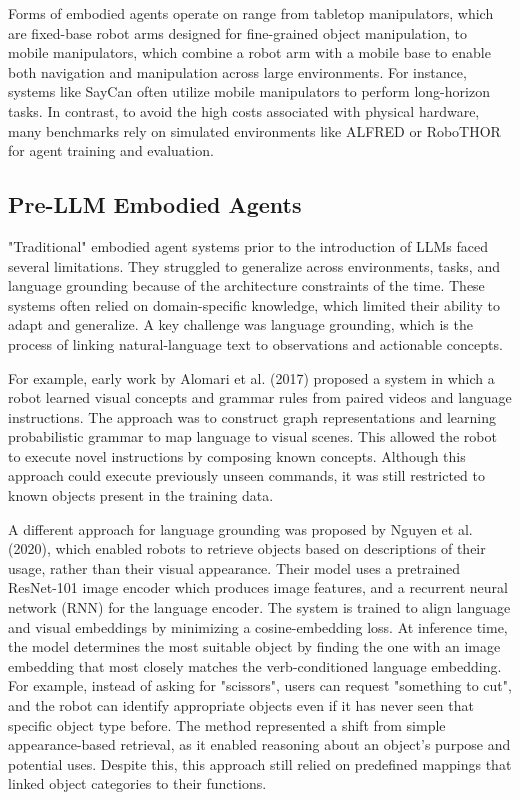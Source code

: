 \documentclass[11pt]{article}
\begin{document}
Forms of embodied agents operate on range from tabletop manipulators, which are fixed-base robot arms designed for fine-grained object manipulation, to mobile manipulators, which combine a robot arm with a mobile base to enable both navigation and manipulation across large environments. For instance, systems like SayCan often utilize mobile manipulators to perform long-horizon tasks. In contrast, to avoid the high costs associated with physical hardware, many benchmarks rely on simulated environments like ALFRED or RoboTHOR for agent training and evaluation. 


\subsection{Pre-LLM Embodied Agents}
"Traditional" embodied agent systems prior to the introduction of LLMs faced several limitations.
They struggled to generalize across environments, tasks, and language grounding because of the architecture constraints of the time. These systems often relied on domain-specific knowledge, which limited their ability to adapt and generalize.
A key challenge was language grounding, which is the process of linking natural-language text to observations and actionable concepts.

For example, early work by Alomari et al. (2017) proposed a system in which a robot learned visual concepts and grammar rules from paired videos and language instructions. The approach was to construct graph representations and learning probabilistic grammar to map language to visual scenes. This allowed the robot to execute novel instructions by composing known concepts. Although this approach could execute previously unseen commands, it was still restricted to known objects present in the training data. 

A different approach for language grounding was proposed by Nguyen et al. (2020), which enabled robots to retrieve objects based on descriptions of their usage, rather than their visual appearance. Their model uses a pretrained ResNet-101 image encoder which produces image features, and a recurrent neural network (RNN) for the language encoder. The system is trained to align language and visual embeddings by minimizing a cosine-embedding loss. At inference time, the model determines the most suitable object by finding the one with an image embedding that most closely matches the verb-conditioned language embedding.
For example, instead of asking for "scissors", users can request "something to cut", and the robot can identify appropriate objects even if it has never seen that specific object type before. The method represented a shift from simple appearance-based retrieval, as it enabled reasoning about an object's purpose and potential uses. Despite this, this approach still relied on predefined mappings that linked object categories to their functions.
\newline
\end{document}
